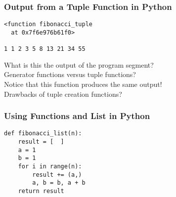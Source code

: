 \documentclass[14pt,aspectratio=169]{beamer}
\begin{document}
%
\begin{frame}[fragile]
  \frametitle{Output from a Tuple Function in Python}
  \normalsize
  \begin{minipage}{6in}
    \vspace*{.1in}
    \begin{verbatim}
<function fibonacci_tuple
  at 0x7f6e976b61f0>

1 1 2 3 5 8 13 21 34 55

    \end{verbatim}
  \vspace*{.35in}
  \begin{minipage}{5.2in}
  \begin{center}
    \normalsize \noindent What is this the output of the program segment? \\
    \normalsize \noindent Generator functions versus tuple functions? \\
    \normalsize \noindent Notice that this function produces the same output! \\
    \normalsize \noindent Drawbacks of tuple creation functions? \\
  \end{center}
  \end{minipage}
  \end{minipage}
\end{frame}

%
\begin{frame}[fragile]
  \frametitle{Using Functions and List in Python}
  \normalsize
  \begin{minipage}{6in}
    \vspace*{.1in}
    \begin{verbatim}
def fibonacci_list(n):
    result = [  ]
    a = 1
    b = 1
    for i in range(n):
        result += (a,)
        a, b = b, a + b
    return result
    \end{verbatim}
  \end{minipage}
\end{frame}
\end{document}
